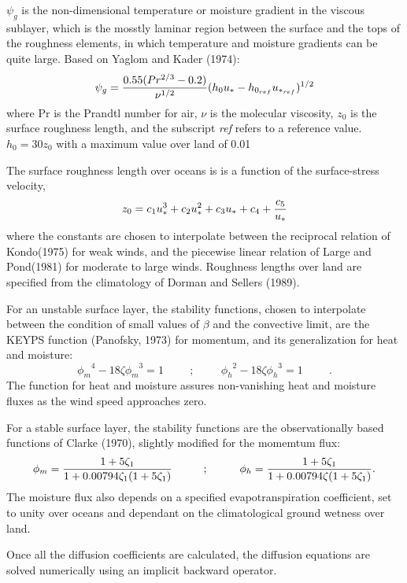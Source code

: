 $\psi_g$ is the non-dimensional temperature or moisture gradient in the viscous sublayer, 
which is the mosstly laminar region between the surface and the tops of the roughness 
elements, in which temperature and moisture gradients can be quite large.
Based on Yaglom and Kader (1974):
\[
\psi_{g} = { 0.55 (Pr^{2/3} - 0.2) \over \nu^{1/2} }
(h_{0}u_{*} - h_{0_{ref}}u_{*_{ref}})^{1/2}
\]
where Pr is the Prandtl number for air, $\nu$ is the molecular viscosity, $z_{0}$ is the 
surface roughness length, and the subscript {\em ref} refers to a reference value.
$h_{0} = 30z_{0}$ with a maximum value over land of 0.01
 
The surface roughness length over oceans is is a function of the surface-stress velocity,
\[
{z_0} = c_1u^3_* + c_2u^2_* + c_3u_* + c_4 + {c_5 \over {u_*}}
\]
where the constants are chosen to interpolate between the reciprocal relation of
Kondo(1975) for weak winds, and the piecewise linear relation of Large and Pond(1981)
for moderate to large winds.  Roughness lengths over land are specified
from the climatology of Dorman and Sellers (1989).

For an unstable surface layer, the stability functions, chosen to interpolate between the
condition of small values of $\beta$ and the convective limit, are the KEYPS function 
(Panofsky, 1973) for momentum, and its generalization for heat and moisture:  
\[
{\phi_m}^4 - 18 \zeta {\phi_m}^3 = 1 \hspace{1cm} ; \hspace{1cm} 
{\phi_h}^2 - 18 \zeta {\phi_h}^3 = 1 \hspace{1cm} .
\]
The function for heat and moisture assures non-vanishing heat and moisture fluxes as the wind 
speed approaches zero. 

For a stable surface layer, the stability functions are the observationally 
based functions of Clarke (1970),  slightly modified for
the momemtum flux:  
\[
{\phi_m} = { { 1 + 5 {{\zeta}_1} } \over { 1 + 0.00794 {{\zeta}_1}
(1+ 5 {{\zeta}_1}) } } \hspace{1cm} ; \hspace{1cm}
{\phi_h} = { { 1 + 5 {{\zeta}_1} } \over { 1 + 0.00794 {\zeta}
(1+ 5 {{\zeta}_1}) } } .
\]
The moisture flux also depends on a specified evapotranspiration
coefficient, set to unity over oceans and dependant on the climatological ground wetness over
land.  

Once all the diffusion coefficients are calculated, the diffusion equations are solved numerically
using an implicit backward operator.

